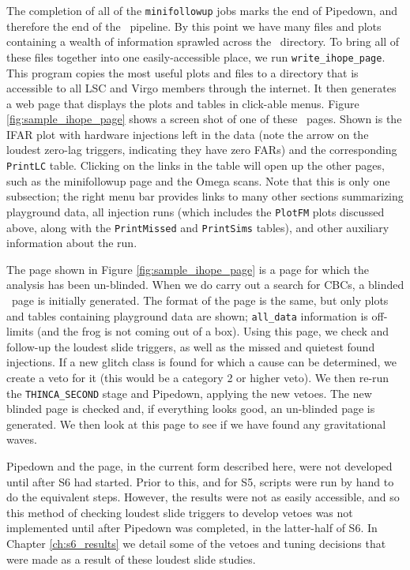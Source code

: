 The completion of all of the \texttt{minifollowup} jobs marks the end of
Pipedown, and therefore the end of the \ihope~pipeline. By this point we have
many files and plots containing a wealth of information sprawled across the
\ihope~directory. To bring all of these files together into one
easily-accessible place, we run \verb|write_ihope_page|. This program copies
the most useful plots and files to a directory that is accessible to all
\ac{LSC} and Virgo members through the internet. It then generates a web page
that displays the plots and tables in click-able menus. Figure
\ref{fig:sample_ihope_page} shows a screen shot of one of these \ihope~pages.
Shown is the IFAR plot with hardware injections left in the data (note the
arrow on the loudest zero-lag triggers, indicating they have zero \acp{FAR})
and the corresponding \texttt{PrintLC} table. Clicking on the links in the
table will open up the other pages, such as the minifollowup page and the Omega
scans. Note that this is only one subsection; the right menu bar provides links
to many other sections summarizing playground data, all injection runs (which
includes the \texttt{PlotFM} plots discussed above, along with the
\texttt{PrintMissed} and \texttt{PrintSims} tables), and other auxiliary
information about the run.

The page shown in Figure \ref{fig:sample_ihope_page} is a page for which the
analysis has been un-blinded. When we do carry out a search for \acp{CBC}, a
blinded \ihope~page is initially generated. The format of the page is the same,
but only plots and tables containing playground data are shown; \verb|all_data|
information is off-limits (and the frog is not coming out of a box). Using this
page, we check and follow-up the loudest slide triggers, as well as the missed
and quietest found injections. If a new glitch class is found for which a cause
can be determined, we create a veto for it (this would be a category 2 or
higher veto). We then re-run the \verb|THINCA_SECOND| stage and Pipedown,
applying the new vetoes. The new blinded page is checked and, if everything
looks good, an un-blinded page is generated. We then look at this page to see
if we have found any gravitational waves.

Pipedown and the \ihope page, in the current form described here, were not
developed until after \ac{S6} had started. Prior to this, and for \ac{S5},
scripts were run by hand to do the equivalent steps. However, the results were
not as easily accessible, and so this method of checking loudest slide triggers
to develop vetoes was not implemented until after Pipedown was completed, in
the latter-half of \ac{S6}. In Chapter \ref{ch:s6_results} we detail some of
the vetoes and tuning decisions that were made as a result of these loudest
slide studies.

